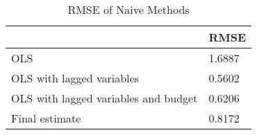 \begin{table}[h!]
\caption{RMSE of Naive Methods}
\label{naive_rmse}
\begin{tabular}{ll}
\toprule
 & RMSE \\
\midrule
OLS & 1.6887 \\
OLS with lagged variables & 0.5602 \\
OLS with lagged variables and budget & 0.6206 \\
Final estimate & 0.8172 \\
\bottomrule
\end{tabular}
\end{table}
